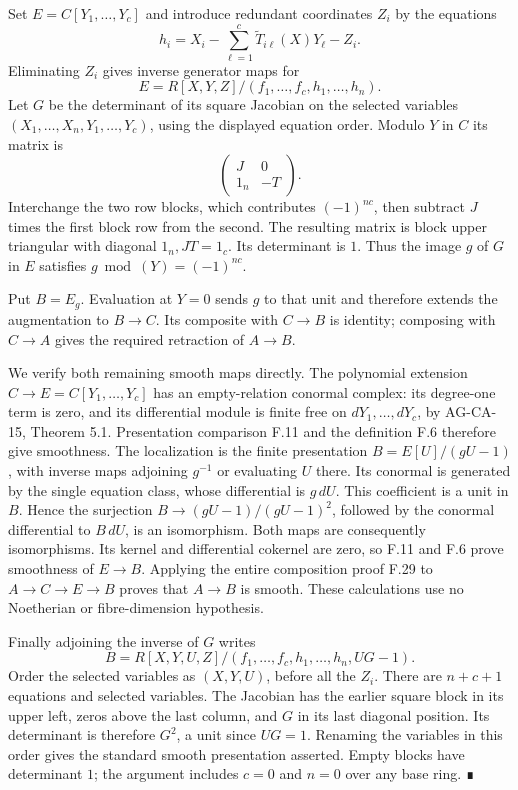 \documentclass[11pt,a4paper,openany]{report}
\begin{document}
Set \(E=C[Y_1,\ldots,Y_c]\) and introduce redundant coordinates \(Z_i\) by the equations \[h_i=X_i-\sum_{\ell=1}^c\widetilde T_{i\ell}(X)Y_\ell-Z_i.\] Eliminating \(Z_i\) gives inverse generator maps for \[E=R[X,Y,Z]/(f_1,\ldots,f_c,h_1,\ldots,h_n).\] Let \(G\) be the determinant of its square Jacobian on the selected variables \((X_1,\ldots,X_n,Y_1,\ldots,Y_c)\), using the displayed equation order. Modulo \(Y\) in \(C\) its matrix is \[\begin{pmatrix}J&0\\1_n&-T\end{pmatrix}.\] Interchange the two row blocks, which contributes \((-1)^{nc}\), then subtract \(J\) times the first block row from the second. The resulting matrix is block upper triangular with diagonal \(1_n,JT=1_c\). Its determinant is \(1\). Thus the image \(g\) of \(G\) in \(E\) satisfies \(g\bmod(Y)=(-1)^{nc}\).

Put \(B=E_g\). Evaluation at \(Y=0\) sends \(g\) to that unit and therefore extends the augmentation to \(B\to C\). Its composite with \(C\to B\) is identity; composing with \(C\to A\) gives the required retraction of \(A\to B\).

We verify both remaining smooth maps directly. The polynomial extension \(C\to E=C[Y_1,\ldots,Y_c]\) has an empty-relation conormal complex: its degree-one term is zero, and its differential module is finite free on \(dY_1,\ldots,dY_c\), by AG-CA-15, Theorem 5.1. Presentation comparison F.11 and the definition F.6 therefore give smoothness. The localization is the finite presentation \(B=E[U]/(gU-1)\), with inverse maps adjoining \(g^{-1}\) or evaluating \(U\) there. Its conormal is generated by the single equation class, whose differential is \(g\,dU\). This coefficient is a unit in \(B\). Hence the surjection \(B\to (gU-1)/(gU-1)^2\), followed by the conormal differential to \(B\,dU\), is an isomorphism. Both maps are consequently isomorphisms. Its kernel and differential cokernel are zero, so F.11 and F.6 prove smoothness of \(E\to B\). Applying the entire composition proof F.29 to \(A\to C\to E\to B\) proves that \(A\to B\) is smooth. These calculations use no Noetherian or fibre-dimension hypothesis.

Finally adjoining the inverse of \(G\) writes \[B=R[X,Y,U,Z]/(f_1,\ldots,f_c,h_1,\ldots,h_n,UG-1).\] Order the selected variables as \((X,Y,U)\), before all the \(Z_i\). There are \(n+c+1\) equations and selected variables. The Jacobian has the earlier square block in its upper left, zeros above the last column, and \(G\) in its last diagonal position. Its determinant is therefore \(G^2\), a unit since \(UG=1\). Renaming the variables in this order gives the standard smooth presentation asserted. Empty blocks have determinant \(1\); the argument includes \(c=0\) and \(n=0\) over any base ring. ∎
\end{document}
